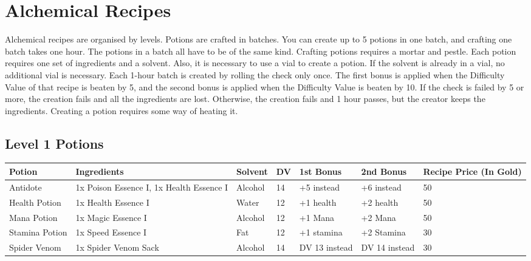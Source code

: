 \section{Alchemical Recipes}\label{sec:alchemicalRecipes}
Alchemical recipes are organised by levels.
Potions are crafted in batches.
You can create up to 5 potions in one batch, and crafting one batch takes one hour.
The potions in a batch all have to be of the same kind.
Crafting potions requires a mortar and pestle.
Each potion requires one set of ingredients and a solvent.
Also, it is necessary to use a vial to create a potion.
If the solvent is already in a vial, no additional vial is necessary.
Each 1-hour batch is created by rolling the check only once. 
The first bonus is applied when the Difficulty Value of that recipe is beaten by 5, and the second bonus is applied when the Difficulty Value is beaten by 10. 
If the check is failed by 5 or more, the creation fails and all the ingredients are lost.
Otherwise, the creation fails and 1 hour passes, but the creator keeps the ingredients.
Creating a potion requires some way of heating it.\\


\subsection{Level 1 Potions}
\begin{longtable}{l | p{2.5cm} | l | l | p{1.5cm} | p{1.5cm} | p{1cm} }
	Potion & Ingredients & Solvent & DV & 1st Bonus & 2nd Bonus & Recipe Price (In Gold)\\ \hline
	Antidote & 1x Poison Essence I, 1x Health Essence I & Alcohol & 14 & +5 instead & +6 instead & 50\\
	Health Potion & 1x Health Essence I & Water & 12 & +1 health & +2 health & 50\\
	Mana Potion & 1x Magic Essence I & Alcohol & 12 & +1 Mana & +2 Mana & 50\\
	Stamina Potion & 1x Speed Essence I & Fat & 12 & +1 stamina & +2 Stamina & 30\\
	Spider Venom & 1x Spider Venom Sack & Alcohol & 14 & DV 13 instead & DV 14 instead & 30\\
\end{longtable}